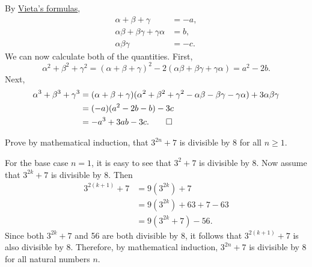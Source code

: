 \begin{solution}
    By \hyperref[thm: vieta]{Vieta's formulas}, 
    \begin{align*}
        \alpha + \beta + \gamma &= -a,\\
        \alpha\beta + \beta\gamma + \gamma\alpha &= b,\\
        \alpha\beta\gamma &= -c.
    \end{align*} 
    We can now calculate both of the quantities. First,
    \[ \alpha^2 + \beta^2 + \gamma^2 = (\alpha + \beta + \gamma)^2 - 2(\alpha\beta + \beta\gamma + \gamma\alpha) = a^2 - 2b. \]
    Next,
    \begin{align*}
        \alpha^3 + \beta^3 + \gamma^3 
        &= (\alpha + \beta + \gamma)(\alpha^2 + \beta^2 + \gamma^2 - \alpha\beta - \beta\gamma - \gamma\alpha) + 3\alpha\beta\gamma\\
        &= (-a)(a^2 - 2b - b) -3c\\
        &= -a^3 + 3ab - 3c. \qedhere
    \end{align*}
\end{solution}

\begin{question}
    Prove by mathematical induction, that $3^{2n} + 7$ is divisible by 8 for
    all $n \geq 1$.
\end{question}
\begin{solution}
    For the base case $n = 1$, it is easy to see that $3^2 + 7$ is divisible by
    8. Now assume that $3^{2k} + 7$ is divisible by 8. Then
    \begin{align*}
        3^{2(k + 1)} + 7 
        &= 9(3^{2k}) + 7\\
        &= 9(3^{2k}) + 63 + 7 - 63\\
        &= 9(3^{2k} + 7) - 56.
    \end{align*}
    Since both $3^{2k} + 7$ and 56 are both divisible by 8, it follows that
    $3^{2(k + 1)} + 7$ is also divisible by 8. Therefore, by mathematical
    induction, $3^{2n} + 7$ is divisible by 8 for all natural numbers $n$.
\end{solution}

